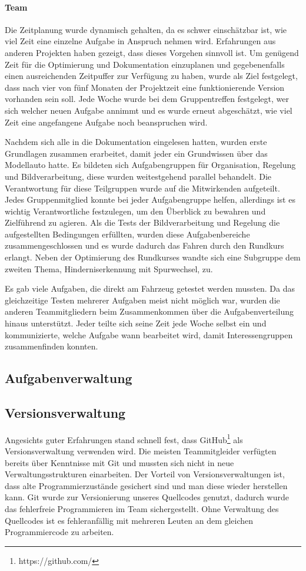 \paragraph{Team}

Die Zeitplanung wurde dynamisch gehalten, da es schwer einschätzbar ist, wie viel Zeit eine einzelne Aufgabe in Anspruch nehmen wird. Erfahrungen aus anderen Projekten haben gezeigt, dass dieses Vorgehen sinnvoll ist. Um genügend Zeit für die Optimierung und Dokumentation einzuplanen und gegebenenfalls einen ausreichenden Zeitpuffer zur Verfügung zu haben, wurde als Ziel festgelegt, dass nach vier von fünf Monaten der Projektzeit eine funktionierende Version vorhanden sein soll. Jede Woche wurde bei dem Gruppentreffen festgelegt, wer sich welcher neuen Aufgabe annimmt und es wurde erneut abgeschätzt, wie viel Zeit eine angefangene Aufgabe noch beanspruchen wird.


Nachdem sich alle in die Dokumentation eingelesen hatten, wurden erste Grundlagen zusammen erarbeitet, damit jeder ein Grundwissen über das Modellauto hatte. Es bildeten sich Aufgabengruppen für Organisation, Regelung und Bildverarbeitung, diese wurden weitestgehend parallel behandelt. Die Verantwortung für diese Teilgruppen wurde auf die Mitwirkenden aufgeteilt. Jedes Gruppenmitglied konnte bei jeder Aufgabengruppe helfen, allerdings ist es wichtig Verantwortliche festzulegen, um den Überblick zu bewahren und Zielführend zu agieren. Als die Tests der Bildverarbeitung und Regelung die aufgestellten Bedingungen erfüllten, wurden diese Aufgabenbereiche zusammengeschlossen und es wurde dadurch das Fahren durch den Rundkurs erlangt. Neben der Optimierung des Rundkurses wandte sich eine Subgruppe dem zweiten Thema, Hinderniserkennung mit Spurwechsel, zu.

Es gab viele Aufgaben, die direkt am Fahrzeug getestet werden mussten. Da das gleichzeitige Testen mehrerer Aufgaben meist nicht möglich war, wurden die anderen Teammitgliedern beim Zusammenkommen über die Aufgabenverteilung hinaus unterstützt. Jeder teilte sich seine Zeit jede Woche selbst ein und kommunizierte, welche Aufgabe wann bearbeitet wird, damit Interessengruppen zusammenfinden konnten. 

\subsection{Aufgabenverwaltung}
\label{sec:aufgabenverwaltung}


\subsection{Versionsverwaltung}
\label{sec:versionsverwaltung}
Angesichts guter Erfahrungen stand schnell fest, dass GitHub\footnote{https://github.com/} als Versionsverwaltung verwenden wird. Die meisten Teammitgleider verfügten bereits über Kenntnisse mit Git und mussten sich nicht in neue Verwaltungsstrukturen einarbeiten. Der Vorteil von Versionsverwaltungen ist, dass alte Programmierzustände gesichert sind und man diese wieder herstellen kann. Git wurde zur Versionierung unseres Quellcodes genutzt, dadurch wurde das fehlerfreie Programmieren im Team sichergestellt. Ohne Verwaltung des Quellcodes ist es fehleranfällig  mit mehreren Leuten an dem gleichen Programmiercode zu arbeiten. 